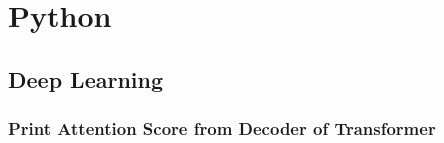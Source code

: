 \chapter{Python}\label{chp:python}
\minitoc

\section{Deep Learning}

\subsection{Print Attention Score from Decoder of Transformer}

\inputminted{python}{code/python/print_prob_from_attention.py}


